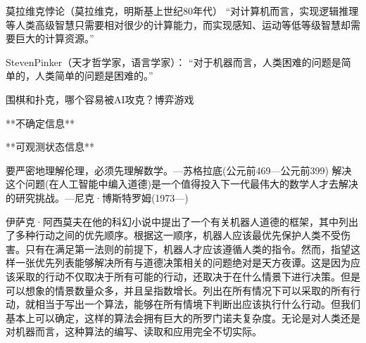 莫拉维克悖论（莫拉维克，明斯基上世纪80年代）
“对计算机而言，实现逻辑推理等人类高级智慧只需要相对很少的计算能力，而实现感知、运动等低等级智慧却需要巨大的计算资源。”

StevenPinker（天才哲学家，语言学家）：
“对于机器而言，人类困难的问题是简单的，人类简单的问题是困难的。”






围棋和扑克，哪个容易被AI攻克？博弈游戏



**不确定信息**



**可观测状态信息**



要严密地理解伦理，必须先理解数学。---苏格拉底(公元前469—公元前399)
解决这个问题(在人工智能中编入道德)是一个值得投入下一代最伟大的数学人才去解决的研究挑战。---尼克·博斯特罗姆(1973—)



伊萨克·阿西莫夫在他的科幻小说中提出了一个有关机器人道德的框架，其中列出了多种行动之间的优先顺序。根据这一顺序，机器人应该最优先保护人类不受伤害。只有在满足第一法则的前提下，机器人才应该遵循人类的指令。然而，指望这样一张优先列表能够解决所有与道德决策相关的问题绝对是天方夜谭。这是因为应该采取的行动不仅取决于所有可能的行动，还取决于在什么情景下进行决策。但是可以想象的情景数量众多，并且呈指数增长。列出在所有情况下可以采取的所有行动，就相当于写出一个算法，能够在所有情境下判断出应该执行什么行动。但我们基本上可以确定，这样的算法会拥有巨大的所罗门诺夫复杂度。无论是对人类还是对机器而言，这种算法的编写、读取和应用完全不切实际。



